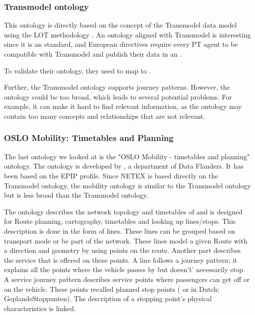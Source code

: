 \subsubsection{Transmodel ontology}
This ontology is directly based on the concept of the Transmodel data model using the LOT methodology \cite{ruckhaus_applying_2023}. An ontology aligned with Transmodel is interesting since it is an  standard, and European directives require every PT agent to be compatible with Transmodel and publish their data in an .

To validate their ontology, they used  to map  to .

Further, the Transmodel ontology supports journey patterns. However, the ontology could be too broad, which leads to several potential problems. For example, it can make it hard to find relevant information, as the ontology may contain too many concepts and relationships that are not relevant.

\subsubsection{OSLO Mobility: Timetables and Planning}
The last ontology we looked at is the "OSLO Mobility - timetables and planning" \cite{noauthor_oslo_2023} ontology. The ontology is developed by , a department of Data Flanders. It has been based on the EPIP profile. Since NETEX is based directly on the Transmodel ontology, the  mobility ontology is similar to the Transmodel ontology but is less broad than the Transmodel ontology.

The ontology describes the network topology and timetables of  and is designed for Route planning, cartography, timetables and looking up lines/stops. This description is done in the form of lines. These lines can be grouped based on transport mode or be part of the network. These lines model a given Route with a direction and geometry by using points on the route. Another part describes the service that is offered on these points. A line follows a journey pattern; it explains all the points where the vehicle passes by but doesn't' necessarily stop. A service journey pattern describes service points where passengers can get off or on the vehicle. These points recalled planned stop points ( or in Dutch: GeplandeStoppunten). The description of a stopping point's physical characteristics is linked. 


